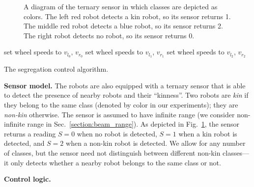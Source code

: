\documentclass[conference]{IEEEtran}
\newcommand{\myparagraph}[1]{\textbf{#1.}}
\begin{document}
\newcommand{\robot}[2]{%
  \filldraw[draw=#2,fill=#2!20] (#1) circle(5mm);
  \draw[draw=#2,->,-Stealth,rotate around={0:(#1)}] (#1) -- +(5mm,0);
  \fill[fill=gray!20] ($(#1)+(5mm,0)$) -- +( 45:1cm) -- +(-45:1cm) -- cycle;%
  \fill[fill=#2] ($(#1)+(5mm,0)$) circle (1mm);%
}
\begin{figure}[t]
  \centering
  \caption{A diagram of the ternary sensor in which classes are depicted
    as colors. The left red robot detects a kin robot, so its sensor
    returns 1. The middle red robot detects a blue robot, so its sensor
    returns 2. The right robot detects no robot, so its sensor returns
    0.}
  \label{fig:sensor}
\end{figure}
\begin{algorithm}[t]
  \begin{algorithmic}
     \State set wheel speeds to $v_{l_0}$, $v_{r_0}$
     \State set wheel speeds to $v_{l_1}$, $v_{r_1}$
    \Else \State set wheel speeds to $v_{l_2}$, $v_{r_2}$
    \EndIf
  \end{algorithmic}
  \caption{The segregation control algorithm.}
  \label{alg:controller}
\end{algorithm}

\myparagraph{Sensor model}
The robots are also equipped with a ternary sensor that is able to detect the
presence of nearby robots and their ``kinness''. Two robots are \emph{kin} if
they belong to the same class (denoted by color in our experiments); they are
\emph{non-kin} otherwise. The sensor is assumed to have infinite range (we
consider non-infinite range in Sec.~\ref{section:beam_range}). As depicted in
Fig.~\ref{fig:sensor}, the sensor returns a reading $S=0$ when no robot is
detected, $S=1$ when a kin robot is detected, and $S=2$ when a non-kin robot is
detected. We allow for any number of classes, but the sensor need not
distinguish between different non-kin classes---it only detects whether a nearby
robot belongs to the same class or not.

\newcommand{\vPN}[2]{\ensuremath{v_{\text{#1}}}^{S=#2}}
\myparagraph{Control logic}
\end{document}
